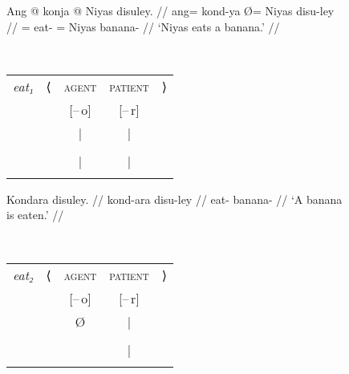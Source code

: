 \begin{figure}
\pex\label{ex:passzn}
\a\label{ex:passzn_act}%
\begin{minipage}[t]{.5\remaining}
\begingl
	\gla Ang @ konja {} @ Niyas disuley. //
	\glb ang= kond-ya Ø= Niyas disu-ley //
	\glc \AgtT{}= eat-\TsgM{} \Top{}= Niyas banana-\PargI{} //
	\glft `Niyas eats a banana.' //
\endgl
\end{minipage}
~
\begin{tabular}[t]{>{\itshape}l l c c r}
eat₁
	& ⟨
	& \textsc{agent}
	& \textsc{patient}
	& ⟩
	\\
%
	& %
	& [–\,o]
	& [–\,r]
	& %
	\\

%
	& %
	& |
	& |
	& %
	\\

%
	& %
	& \Subj*
	& \Obj
	& %
	\\

%
	& %
	& |
	& |
	& %
	\\

%
	& %
	& \fw{Niyas}
	& \fw{banana}
	& %
	\\
\end{tabular}

\a\label{ex:passzn_pass}%
\begin{minipage}[t]{.5\remaining}
\begingl
	\gla Kondara disuley. //
	\glb kond-ara disu-ley //
	\glc eat-\TsgI{} banana-\PargI{} //
	\glft `A banana is eaten.' //
\endgl
\end{minipage}
~
\begin{tabular}[t]{>{\itshape}l l c c r}
eat₂
	& ⟨
	& \textsc{agent}
	& \textsc{patient}
	& ⟩
	\\
%
	& %
	& [–\,o]
	& [–\,r]
	& %
	\\

%
	& %
	& Ø
	& |
	& %
	\\

%
	& %
	& %
	& \Subj
	& %
	\\

%
	& %
	& %
	& |
	& %
	\\

%
	& %
	& %
	& \fw{banana}
	& %
	\\
\end{tabular}

\xe
\end{figure}

